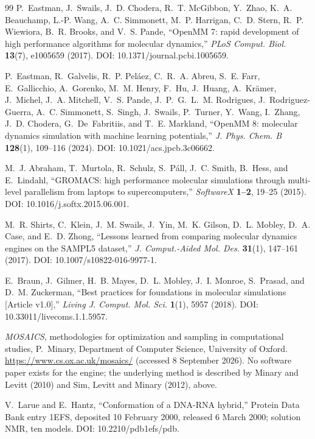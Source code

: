 \begin{thebibliography}{99}
P.~Eastman, J.~Swails, J.~D. Chodera, R.~T. McGibbon, Y.~Zhao, K.~A. Beauchamp,
L.-P. Wang, A.~C. Simmonett, M.~P. Harrigan, C.~D. Stern, R.~P. Wiewiora,
B.~R. Brooks, and V.~S. Pande,
``OpenMM 7: rapid development of high performance algorithms for molecular
dynamics,''
\emph{PLoS Comput. Biol.} \textbf{13}(7), e1005659 (2017).
DOI: 10.1371/journal.pcbi.1005659.

P.~Eastman, R.~Galvelis, R.~P. Pel\'aez, C.~R.~A. Abreu, S.~E. Farr,
E.~Gallicchio, A.~Gorenko, M.~M. Henry, F.~Hu, J.~Huang, A.~Kr\"amer,
J.~Michel, J.~A. Mitchell, V.~S. Pande, J.~P.~G.~L.~M. Rodrigues,
J.~Rodriguez-Guerra, A.~C. Simmonett, S.~Singh, J.~Swails, P.~Turner,
Y.~Wang, I.~Zhang, J.~D. Chodera, G.~De~Fabritiis, and T.~E. Markland,
``OpenMM 8: molecular dynamics simulation with machine learning potentials,''
\emph{J. Phys. Chem. B} \textbf{128}(1), 109--116 (2024).
DOI: 10.1021/acs.jpcb.3c06662.

M.~J. Abraham, T.~Murtola, R.~Schulz, S.~P\'all, J.~C. Smith, B.~Hess, and
E.~Lindahl,
``GROMACS: high performance molecular simulations through multi-level
parallelism from laptops to supercomputers,''
\emph{SoftwareX} \textbf{1--2}, 19--25 (2015).
DOI: 10.1016/j.softx.2015.06.001.

M.~R. Shirts, C.~Klein, J.~M. Swails, J.~Yin, M.~K. Gilson, D.~L. Mobley,
D.~A. Case, and E.~D. Zhong,
``Lessons learned from comparing molecular dynamics engines on the SAMPL5
dataset,''
\emph{J. Comput.-Aided Mol. Des.} \textbf{31}(1), 147--161 (2017).
DOI: 10.1007/s10822-016-9977-1.

E.~Braun, J.~Gilmer, H.~B. Mayes, D.~L. Mobley, J.~I. Monroe, S.~Prasad, and
D.~M. Zuckerman,
``Best practices for foundations in molecular simulations [Article v1.0],''
\emph{Living J. Comput. Mol. Sci.} \textbf{1}(1), 5957 (2018).
DOI: 10.33011/livecoms.1.1.5957.

\emph{MOSAICS}, methodologies for optimization and sampling in computational
studies, P.~Minary, Department of Computer Science, University of Oxford.
\url{https://www.cs.ox.ac.uk/mosaics/} (accessed 8 September 2026). No
software paper exists for the engine; the underlying method is described by
Minary and Levitt (2010) and Sim, Levitt and Minary (2012), above.

V.~Larue and E.~Hantz,
``Conformation of a DNA-RNA hybrid,''
Protein Data Bank entry 1EFS, deposited 10 February 2000, released 6 March
2000; solution NMR, ten models.
DOI: 10.2210/pdb1efs/pdb.


\end{thebibliography}
